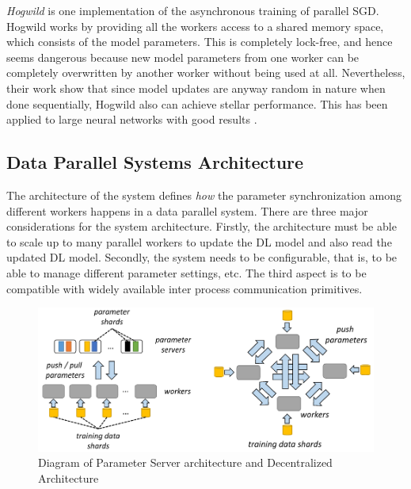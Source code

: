\emph{Hogwild} \cite{NiuHOGWILD:Descent} is one implementation of the asynchronous training of parallel SGD. Hogwild works by providing all the workers access to a shared memory space, which consists of the model parameters. This is completely lock-free, and hence seems dangerous because new model parameters from one worker can be completely overwritten by another worker without being used at all. Nevertheless, their work show that since model updates are anyway random in nature when done sequentially, Hogwild also can achieve stellar performance. This has been applied to large neural networks with good results \cite{Deyringer2017ParallelizationHogwild}. 


\subsection{Data Parallel Systems Architecture}
The architecture of the system defines \emph{how} the parameter synchronization among different workers happens in a data parallel system. There are three major considerations for the system architecture. Firstly, the architecture must be able to scale up to many parallel workers to update the DL model and also read the updated DL model. Secondly, the system needs to be configurable, that is, to be able to manage different parameter settings, etc. The third aspect is to be compatible with widely available inter process communication primitives.

\begin{figure}[ht]
  \begin{center}
    \includegraphics[width=\textwidth]{images/architecture_.png} 
    \caption{Diagram of Parameter Server architecture and Decentralized Architecture  \cite{Mayer2020ScalableInfrastructures}}
    \label{fig:arch}
  \end{center}
\end{figure}


